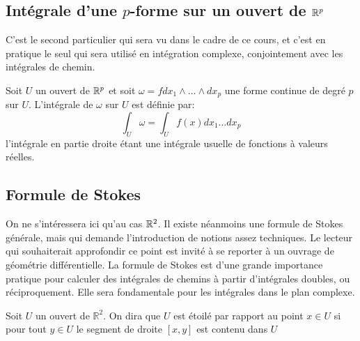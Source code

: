 \subsection{Intégrale d'une $p$-forme sur un ouvert de $\mathbb{R}^p$}
C'est le second particulier qui sera vu dans le cadre de ce cours, et c'est en pratique le seul qui sera utilisé en intégration complexe, conjointement avec les intégrales de chemin. 
\begin{fdefn}
Soit $U$ un ouvert de $\mathbb{R}^p$ et soit $\omega = f dx_1\wedge\dots\wedge dx_p$ une forme continue de degré $p$ sur $U$. L'intégrale de $\omega$ sur $U$ est définie par:
\[
\int_U \omega = \int_U f(x) dx_1\dots dx_p
\]
l'intégrale en partie droite étant une intégrale usuelle de fonctions à valeurs réelles. 
\end{fdefn}

\subsection{Formule de Stokes}
On ne s'intéressera ici qu'au cas $\mathbb{R}^2$. Il existe néanmoins une formule de Stokes générale, mais qui demande l'introduction de notions assez techniques. Le lecteur qui souhaiterait approfondir ce point est invité à se reporter à un ouvrage de géométrie différentielle.  
La formule de Stokes est d'une grande importance pratique pour calculer des intégrales
de chemins à partir d'intégrales doubles, ou réciproquement. Elle sera
fondamentale pour les intégrales dans le plan complexe. 


\begin{fdefn}
Soit $U$ un ouvert de $\mathbb{R}^2$. On dira que $U$ est étoilé par rapport au
point $x \in U$ si pour tout $y \in U$ le segment de droite $[x,y]$ est contenu
dans $U$
\end{fdefn}


